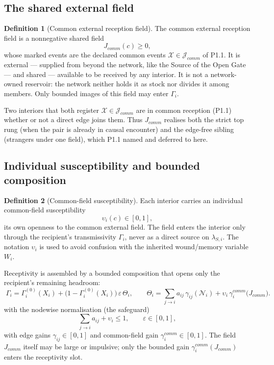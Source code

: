 \documentclass[11pt,a4paper]{article}
\def\mathfrak#1{#1}%
\def\mathrm#1{#1}%
\def\emph#1{#1}%
\theoremstyle{definition}
\newtheorem{definition}{Definition}[section]
\theoremstyle{plain}
\theoremstyle{remark}
\begin{document}
\subsection{The shared external field}

\begin{definition}[Common external reception field]\label{def:jcomm}
The \emph{common external reception field} is a nonnegative shared field
\[
J_{\mathrm{comm}}(\mathfrak c)\ge0,
\]
whose marked events are the declared common events
\(\mathcal X\in\mathcal J_{\mathrm{comm}}\) of P1.1. It is \emph{external} ---
supplied from beyond the network, like the Source of the Open Gate --- and
\emph{shared} --- available to be received by any interior. It is \emph{not} a
network-owned reservoir: the network neither holds it as stock nor divides it
among members. Only bounded images of this field may enter \(\Gamma_i\).
\end{definition}

Two interiors that both register \(\mathcal X\in\mathcal J_{\mathrm{comm}}\) are in common
reception (P1.1) \emph{whether or not} a direct edge joins them. Thus \(J_{\mathrm{comm}}\)
realises both the strict top rung (when the pair is already in causal encounter) and the
edge-free sibling (strangers under one field), which P1.1 named and deferred to here.

\subsection{Individual susceptibility and bounded composition}

\begin{definition}[Common-field susceptibility]\label{def:suscept}
Each interior carries an individual common-field susceptibility
\[
\upsilon_i(\mathfrak c)\in[0,1],
\]
its own openness to the common external field. The field enters the interior only
through the recipient's transmissivity \(\Gamma_i\), never as a direct source on
\(\lambda_{S,i}\). The notation \(\upsilon_i\) is used to avoid confusion with the
inherited wound/memory variable \(W_i\).
\end{definition}

Receptivity is assembled by a bounded composition that opens only the recipient's remaining
headroom:
\[
\boxed{\;
\Gamma_i
=
\Gamma_i^{(0)}(X_i)
+
\bigl(1-\Gamma_i^{(0)}(X_i)\bigr)\,\varepsilon\,\Theta_i,
\qquad
\Theta_i
=
\sum_{j\to i} a_{ij}\,\gamma_{ij}(\mathcal N_i)
+
\upsilon_i\,\gamma_i^{\mathrm{comm}}\bigl(J_{\mathrm{comm}}\bigr).
\;}
\]
with the nodewise normalisation (the safeguard)
\[
\sum_{j\to i} a_{ij}+\upsilon_i\le1,
\qquad
\varepsilon\in[0,1],
\]
with edge gains \(\gamma_{ij}\in[0,1]\) and common-field gain
\(\gamma_i^{\mathrm{comm}}\in[0,1]\). The field \(J_{\mathrm{comm}}\) itself may be
large or impulsive; only the bounded gain
\(\gamma_i^{\mathrm{comm}}(J_{\mathrm{comm}})\) enters the receptivity slot.
\end{document}
